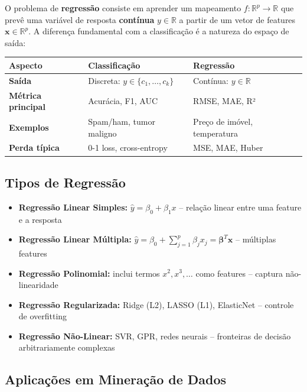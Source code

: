 \documentclass[12pt,a4paper]{article}
\begin{document}
O problema de \textbf{regressão} consiste em aprender um mapeamento $f: \mathbb{R}^p \rightarrow \mathbb{R}$ que prevê uma variável de resposta \textbf{contínua} $y \in \mathbb{R}$ a partir de um vetor de features $\mathbf{x} \in \mathbb{R}^p$. A diferença fundamental com a classificação é a natureza do espaço de saída:

\begin{center}
\begin{tabular}{>{\bfseries}p{3cm}p{4.5cm}p{4.5cm}}
\toprule
Aspecto & Classificação & Regressão \\
\midrule
Saída & Discreta: $y \in \{c_1,\ldots,c_k\}$ & Contínua: $y \in \mathbb{R}$ \\
Métrica principal & Acurácia, F1, AUC & RMSE, MAE, R² \\
Exemplos & Spam/ham, tumor maligno & Preço de imóvel, temperatura \\
Perda típica & 0-1 loss, cross-entropy & MSE, MAE, Huber \\
\bottomrule
\end{tabular}
\end{center}

\subsection{Tipos de Regressão}

\begin{itemize}
  \item \textbf{Regressão Linear Simples:} $\hat{y} = \beta_0 + \beta_1 x$ -- relação linear entre uma feature e a resposta
  \item \textbf{Regressão Linear Múltipla:} $\hat{y} = \beta_0 + \sum_{j=1}^p \beta_j x_j = \boldsymbol{\beta}^T\mathbf{x}$ -- múltiplas features
  \item \textbf{Regressão Polinomial:} inclui termos $x^2, x^3, \ldots$ como features -- captura não-linearidade
  \item \textbf{Regressão Regularizada:} Ridge (L2), LASSO (L1), ElasticNet -- controle de overfitting
  \item \textbf{Regressão Não-Linear:} SVR, GPR, redes neurais -- fronteiras de decisão arbitrariamente complexas
\end{itemize}

\subsection{Aplicações em Mineração de Dados}
\end{document}
